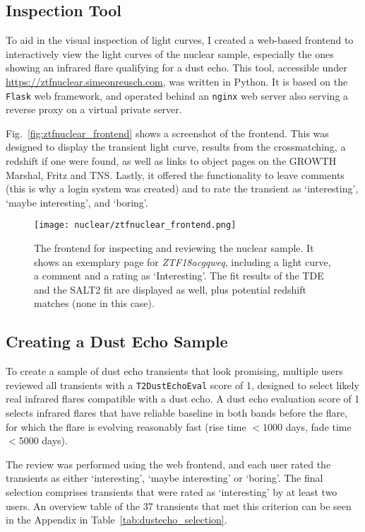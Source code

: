 \subsection{Inspection Tool}
To aid in the visual inspection of light curves, I created a web-based frontend to interactively view the light curves of the nuclear sample, especially the ones showing an infrared flare qualifying for a dust echo. This tool, accessible under \url{https://ztfnuclear.simeonreusch.com}, was written in Python. It is based on the \texttt{Flask} web framework, and operated behind an \texttt{nginx} web server also serving a reverse proxy on a virtual private server.

Fig.~\ref{fig:ztfnuclear_frontend} shows a screenshot of the frontend. This was designed to display the transient light curve, results from the crossmatching, a redshift if one were found, as well as links to object pages on the GROWTH Marshal, Fritz and TNS. Lastly, it offered the functionality to leave comments (this is why a login system was created) and to rate the transient as `interesting', `maybe interesting', and `boring'.

\begin{figure}[htb]
  \texttt{[image: nuclear/ztfnuclear\_frontend.png]}
  \caption[Frontend for the nuclear sample]{The frontend for inspecting and reviewing the nuclear sample. It shows an exemplary page for \textit{ZTF18acgqweq}, including a light curve, a comment and a rating as `Interesting'. The fit results of the TDE and the SALT2 fit are displayed as well, plus potential redshift matches (none in this case).}
\end{figure}

\subsection{Creating a Dust Echo Sample}
To create a sample of dust echo transients that look promising, multiple users reviewed all transients with a \texttt{T2DustEchoEval} score of 1, designed to select likely real infrared flares compatible with a dust echo. A dust echo evaluation score of 1 selects infrared flares that have reliable baseline in both bands before the flare, for which the flare is evolving reasonably fast (rise time $<1000$ days, fade time $<5000$ days).

The review was performed using the web frontend, and each user rated the transients as either `interesting', `maybe interesting' or `boring'. The final selection comprises transients that were rated as `interesting' by at least two users. An overview table of the 37 transients that met this criterion can be seen in the Appendix in Table~\ref{tab:dustecho_selection}.

